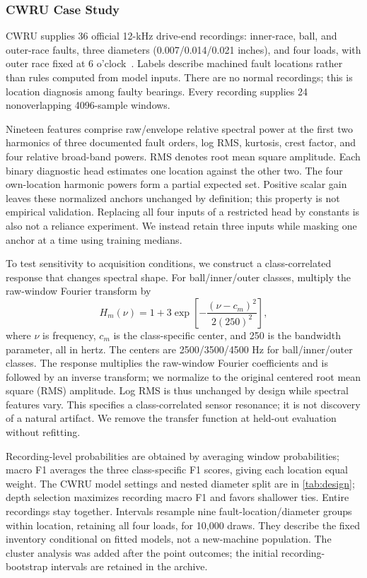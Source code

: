 \documentclass[conference]{IEEEtran}
\begin{document}
\subsubsection{CWRU Case Study}
CWRU supplies 36 official 12-kHz drive-end recordings: inner-race, ball, and outer-race faults, three diameters (0.007/0.014/0.021 inches), and four loads, with outer race fixed at 6 o'clock~\cite{cwru2026}. Labels describe machined fault locations rather than rules computed from model inputs. There are no normal recordings; this is location diagnosis among faulty bearings. Every recording supplies 24 nonoverlapping 4096-sample windows.

Nineteen features comprise raw/envelope relative spectral power at the first two harmonics of three documented fault orders, log RMS, kurtosis, crest factor, and four relative broad-band powers. RMS denotes root mean square amplitude. Each binary diagnostic head estimates one location against the other two. The four own-location harmonic powers form a partial expected set. Positive scalar gain leaves these normalized anchors unchanged by definition; this property is not empirical validation. Replacing all four inputs of a restricted head by constants is also not a reliance experiment. We instead retain three inputs while masking one anchor at a time using training medians.

To test sensitivity to acquisition conditions, we construct a class-correlated response that changes spectral shape. For ball/inner/outer classes, multiply the raw-window Fourier transform by
\begin{equation}
 H_m(\nu)=1+3\exp\!\left[-\frac{(\nu-c_m)^2}{2(250)^2}\right],
\end{equation}
where $\nu$ is frequency, $c_m$ is the class-specific center, and 250 is the bandwidth parameter, all in hertz. The centers are 2500/3500/4500 Hz for ball/inner/outer classes. The response multiplies the raw-window Fourier coefficients and is followed by an inverse transform; we normalize to the original centered root mean square (RMS) amplitude. Log RMS is thus unchanged by design while spectral features vary. This specifies a class-correlated sensor resonance; it is not discovery of a natural artifact. We remove the transfer function at held-out evaluation without refitting.

Recording-level probabilities are obtained by averaging window probabilities; macro F1 averages the three class-specific F1 scores, giving each location equal weight. The CWRU model settings and nested diameter split are in \cref{tab:design}; depth selection maximizes recording macro F1 and favors shallower ties. Entire recordings stay together. Intervals resample nine fault-location/diameter groups within location, retaining all four loads, for 10,000 draws. They describe the fixed inventory conditional on fitted models, not a new-machine population. The cluster analysis was added after the point outcomes; the initial recording-bootstrap intervals are retained in the archive.
\end{document}
